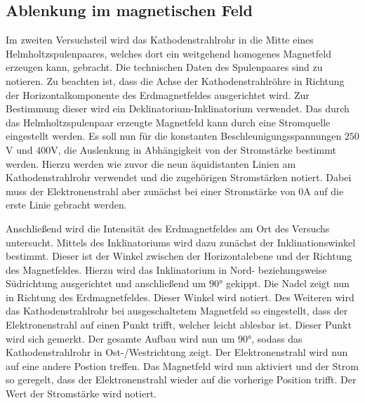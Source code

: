     \subsection{Ablenkung im magnetischen Feld}
    Im zweiten Versuchsteil wird das Kathodenstrahlrohr in die Mitte eines Helmholtzspulenpaares, welches dort ein weitgehend homogenes Magnetfeld
    erzeugen kann, gebracht. Die technischen Daten des Spulenpaares sind zu notieren. Zu beachten ist, dass die Achse der Kathodenstrahlröhre in 
    Richtung der Horizontalkomponente des Erdmagnetfeldes ausgerichtet wird. Zur Bestimmung dieser wird ein Deklinatorium-Inklinatorium
    verwendet. Das durch das Helmholtzspulenpaar erzeugte Magnetfeld kann durch eine Stromquelle eingestellt werden. Es soll nun für die 
    konstanten Beschleunigungsspannungen $250$V und $400$V, die Auslenkung in Abhängigkeit von der Stromstärke bestimmt werden. 
    Hierzu werden wie zuvor die neun äquidistanten Linien am Kathodenstrahlrohr verwendet und die zugehörigen Stromstärken notiert.
    Dabei muss der Elektronenstrahl aber zunächst bei einer Stromstärke von $0$A auf die erste Linie gebracht werden.
    
    Anschließend wird die Intensität des Erdmagnetfeldes am Ort des Versuchs untersucht. Mittels des Inklinatoriums wird dazu zunächst der
    Inklinationswinkel bestimmt. Dieser ist der Winkel zwischen der Horizontalebene und der Richtung des Magnetfeldes. Hierzu wird das 
    Inklinatorium in Nord- beziehungsweise Südrichtung ausgerichtet und anschließend um $90°$ gekippt. Die Nadel zeigt nun in Richtung des
    Erdmagnetfeldes. Dieser Winkel wird notiert. Des Weiteren wird das Kathodenstrahlrohr bei ausgeschaltetem Magnetfeld so eingestellt, dass
    der Elektronenstrahl auf einen Punkt trifft, welcher leicht ablesbar ist. Dieser Punkt wird sich gemerkt. Der gesamte Aufbau wird nun um $90°$,
    sodass das Kathodenstrahlrohr in Ost-/Westrichtung zeigt. Der Elektronenstrahl wird nun auf eine andere Postion treffen. 
    Das Magnetfeld wird nun aktiviert und der Strom so geregelt, dass der Elektronenstrahl 
    wieder auf die vorherige Position trifft. Der Wert der Stromstärke wird notiert.